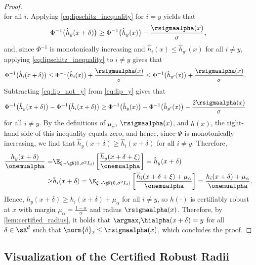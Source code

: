 \documentclass[11pt, letterpaper]{article}
\theoremstyle{plain}
\theoremstyle{definition}
\begin{document}
\begin{proof}
\begin{equation}
	\end{equation}
	for all $i$. Applying \cref{eq:lipschitz_inequality} for $i=y$ yields that
	\begin{equation} \label{eq:lip_y}
		\Phi^{-1} \big( \hat{h}_y (x+\delta) \big) \ge \Phi^{-1} \big( \hat{h}_y (x) \big) - \frac{\rsigmaalpha (x)} {\sigma},
	\end{equation}
	and, since $\Phi^{-1}$ is monotonically increasing and $\hat{h}_i(x) \le \hat{h}_{y'} (x)$ for all $i \ne y$, applying \cref{eq:lipschitz_inequality} to $i \ne y$ gives that
	\begin{align} \label{eq:lip_not_y}
		\Phi^{-1} \big( \hat{h}_i (x+\delta) \big) & \le \Phi^{-1} \big( \hat{h}_i (x) \big) + \frac{\rsigmaalpha (x)} {\sigma} \le \Phi^{-1} \big( \hat{h}_{y'} (x) \big) + \frac{\rsigmaalpha (x)} {\sigma}.
	\end{align}
	Subtracting \cref{eq:lip_not_y} from \cref{eq:lip_y} gives that
	\begin{align*}
		\Phi^{-1} \big( \hat{h}_y (x+\delta) \big) & - \Phi^{-1} \big( \hat{h}_i (x+\delta) \big) \ge \Phi^{-1} \big( \hat{h}_y (x) \big) - \Phi^{-1} \big( \hat{h}_{y'} (x) \big) - \frac{2 \rsigmaalpha (x)} {\sigma}
	\end{align*}
	for all $i \ne y$. By the definitions of $\mu_\alpha$, $\rsigmaalpha (x)$, and $\hat{h} (x)$, the right-hand side of this inequality equals zero, and hence, since $\Phi$ is monotonically increasing, we find that $\hat{h}_y (x+\delta) \ge \hat{h}_i (x+\delta)$ for all $i \ne y$. Therefore,
	\begin{align*}
		\frac{h_y(x+\delta)} {\onemualpha} = & \E_{\xi \sim \gN (0, \sigma^2 I_d)} \left[ \frac{\overline{h}_y (x+\delta+\xi)} {\onemualpha} \right] = \hat{h}_y (x+\delta) \\
		\ge & \hat{h}_i (x+\delta) = \E_{\xi \sim \gN (0, \sigma^2 I_d)} \left[ \frac{\overline{h}_i (x+\delta+\xi) + \mu_\alpha} {\onemualpha} \right] = \frac{h_i (x+\delta) + \mu_\alpha} {\onemualpha}.
	\end{align*}
	Hence, $h_y (x+\delta) \ge h_i (x+\delta) + \mu_\alpha$ for all $i \ne y$, so $h (\cdot)$ is certifiably robust at $x$ with margin $\mu_\alpha = \frac{1-\alpha} {\alpha}$ and radius $\rsigmaalpha (x)$. Therefore, by \cref{lem:certified_radius}, it holds that $\argmax_i \hialpha (x+\delta) = y$ for all $\delta \in \sR^d$ such that $\norm{\delta}_2 \le \rsigmaalpha (x)$, which concludes the proof.
\end{proof}


\subsection{Visualization of the Certified Robust Radii} \label{sec:certified_exp}
\end{document}
